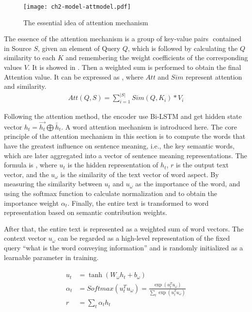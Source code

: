 \begin{figure}[htbp!]
    \centering
    \texttt{[image: ch2-model-attmodel.pdf]}
    \caption{The essential idea of attention mechanism}\label{fig:ch2-model-attmodel}
\end{figure}


The essence of the attention mechanism is a group of key-value pairs \(<K, V>\) contained in Source \(S\), given an element of Query \(Q\), which is followed by calculating the \(Q\) similarity to each \(K\) and remembering the weight coefficients of the corresponding values \(V\). It is showed in \figname{\ref{fig:ch2-model-attmodel}}. Then a weighted sum is performed to obtain the final Attention value. It can be expressed as \eqname{\ref{fml:ch2-attention}}, where \(Att\) and \(Sim\) represent attention and similarity.
\begin{align}\label{fml:ch2-attention}
    Att(Q,S) = \sum_{i=1}^{|S|}Sim(Q,K_i)*V_i
\end{align}

Following the attention method, the encoder use Bi-LSTM and get hidden state vector \(h_t=\overrightarrow{h_t}\bigoplus \overleftarrow{h_t}\). A word attention mechanism is introduced here. The core principle of the attention mechanism in this section is to compute the words that have the greatest influence on sentence meaning, i.e., the key semantic words, which are later aggregated into a vector of sentence meaning representations. The formula is \eqname{\ref{fml:ch2-att2}}, where \(u_t\) is the hidden representation of \(h_t\), \(r\) is the output text vector, and the \(u_\omega \) is the similarity of the text vector of word aspect. By measuring the similarity between \(u_t\) and \(u_\omega \) as the importance of the word, and using the softmax function to calculate normalization and to obtain the importance weight \(\alpha_{t}\). Finally, the entire text is transformed to word representation based on semantic contribution weights.

%
After that, the entire text is represented as a weighted sum of word vectors. The context vector \(u_\omega \) can be regarded as a high-level representation of the fixed query ``what is the word conveying information'' and is randomly initialized as a learnable parameter in training.


\begin{align}\label{fml:ch2-att2}
    \begin{split}
        u_t      & = \tanh(W_\omega h_t + b_\omega )                                                    \\
        \alpha_t & =Softmax(u_t^T u_\omega) = \frac{\exp( u_t^T u_\omega)}{\sum_t \exp(u_t^T u_\omega)} \\
        r        & = \sum_t{\alpha_t h_t}
    \end{split}
\end{align}

